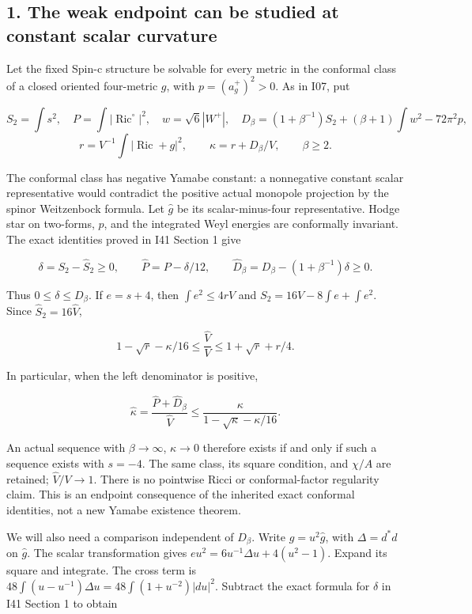 \documentclass[
  10pt,
]{article}
\begin{document}
\hypertarget{the-weak-endpoint-can-be-studied-at-constant-scalar-curvature}{%
\subsection{1. The weak endpoint can be studied at constant scalar
curvature}\label{the-weak-endpoint-can-be-studied-at-constant-scalar-curvature}}

Let the fixed Spin-c structure be solvable for every metric in the
conformal class of a closed oriented four-metric \(g\), with
\(p=(a_g^+)^2>0\). As in I07, put

\[
 S_2=\int s^2,\quad P=\int|\operatorname{Ric}^{\circ}|^2,
 \quad w=\sqrt6|W^+|,\quad
 D_\beta=(1+\beta^{-1})S_2+(\beta+1)\int w^2-72\pi^2p,
\] \[
 r=V^{-1}\int|\operatorname{Ric}+g|^2,\qquad
 \kappa=r+D_\beta/V,\qquad \beta\ge2.
 \tag{1.1}
\]

The conformal class has negative Yamabe constant: a nonnegative constant
scalar representative would contradict the positive actual monopole
projection by the spinor Weitzenbock formula. Let \(\widehat g\) be its
scalar-minus-four representative. Hodge star on two-forms, \(p\), and
the integrated Weyl energies are conformally invariant. The exact
identities proved in I41 Section 1 give

\[
 \delta=S_2-\widehat S_2\ge0,\qquad
 \widehat P=P-\delta/12,\qquad
 \widehat D_\beta=D_\beta-(1+\beta^{-1})\delta\ge0.
 \tag{1.2}
\]

Thus \(0\le\delta\le D_\beta\). If \(e=s+4\), then \(\int e^2\le4rV\)
and \(S_2=16V-8\int e+\int e^2\). Since \(\widehat S_2=16\widehat V\),

\[
 1-\sqrt r-\kappa/16
 \le\frac{\widehat V}{V}
 \le1+\sqrt r+r/4.
 \tag{1.3}
\]

In particular, when the left denominator is positive,

\[
 \boxed{\widehat\kappa
 =\frac{\widehat P+\widehat D_\beta}{\widehat V}
 \le\frac{\kappa}{1-\sqrt\kappa-\kappa/16}.}
 \tag{1.4}
\]

An actual sequence with \(\beta\to\infty\), \(\kappa\to0\) therefore
exists if and only if such a sequence exists with \(s=-4\). The same
class, its square condition, and \(\chi/A\) are retained;
\(\widehat V/V\to1\). There is no pointwise Ricci or conformal-factor
regularity claim. This is an endpoint consequence of the inherited exact
conformal identities, not a new Yamabe existence theorem.

We will also need a comparison independent of \(D_\beta\). Write
\(g=u^2\widehat g\), with \(\Delta=d^*d\) on \(\widehat g\). The scalar
transformation gives \(e u^2=6u^{-1}\Delta u+4(u^2-1)\). Expand its
square and integrate. The cross term is
\(48\int(u-u^{-1})\Delta u =48\int(1+u^{-2})|du|^2\). Subtract the exact
formula for \(\delta\) in I41 Section 1 to obtain
\end{document}
